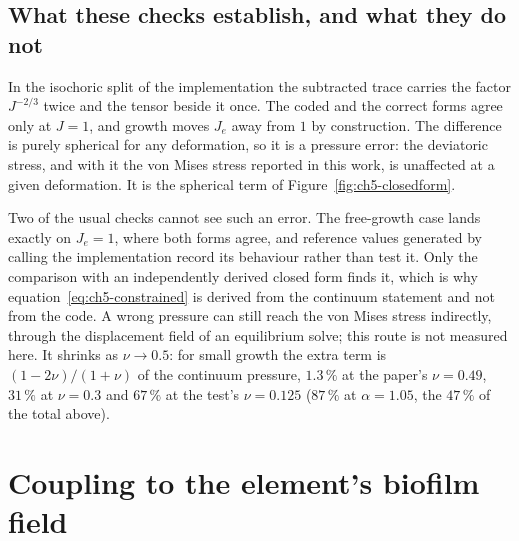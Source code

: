 \subsection{What these checks establish, and what they do not}
\label{sec:ch5-verification-limits}
In the isochoric split of the implementation the subtracted trace carries the factor $J^{-2/3}$
twice and the tensor beside it once. The coded and the correct forms agree
only at $J=1$, and growth moves $J_e$ away from $1$ by
construction. The difference is purely spherical for any deformation, so it is
a pressure error: the deviatoric stress, and with it the von Mises stress
reported in this work, is unaffected at a given deformation. It is the
spherical term of Figure~\ref{fig:ch5-closedform}.

Two of the usual checks cannot see such an error. The free-growth case lands
exactly on $J_e=1$, where both forms agree, and reference values generated by
calling the implementation record its behaviour rather than test it. Only the
comparison with an independently derived closed form finds it, which is why
equation~\eqref{eq:ch5-constrained} is derived from the continuum statement
and not from the code. A wrong pressure can still reach the von Mises stress
indirectly, through the displacement field of an equilibrium solve; this route
is not measured here. It shrinks as $\nu\to0.5$: for small growth the extra term is
$(1-2\nu)/(1+\nu)$ of the continuum pressure, $1.3\,\%$ at the paper's
$\nu=0.49$, $31\,\%$ at $\nu=0.3$ and $67\,\%$ at the test's $\nu=0.125$ ($87\,\%$ at
$\alpha=1.05$, the $47\,\%$ of the total above).

\section{Coupling to the element's biofilm field}
\label{sec:ch5-coupling}

